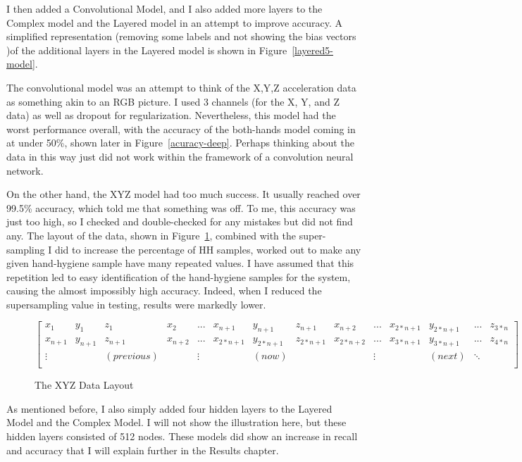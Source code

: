 \documentclass[]{report}
\begin{document}
I then added a Convolutional Model, and I also added more layers to the Complex model and the Layered model in an attempt to improve accuracy. A simplified representation (removing some labels and not showing the bias vectors )of the additional layers in the Layered model is shown in Figure~\ref{layered5-model}.

The convolutional model was an attempt to think of the X,Y,Z acceleration data as something akin to an RGB picture. I used 3 channels (for the X, Y, and Z data) as well as dropout for regularization. Nevertheless, this model had the worst performance overall, with the accuracy of the both-hands model coming in at under 50\%, shown later in Figure~\ref{acuracy-deep}. Perhaps thinking about the data in this way just did not work within the framework of a convolution neural network.

On the other hand, the XYZ model had too much success. It usually reached over 99.5\% accuracy, which told me that something was off. To me, this accuracy was just too high, so I checked and double-checked for any mistakes but did not find any. The layout of the data, shown in Figure~\ref{xyz-data}, combined with the super-sampling I did to increase the percentage of HH samples, worked out to make any given hand-hygiene sample have many repeated values. I have assumed that this repetition led to easy identification of the hand-hygiene samples for the system, causing the almost impossibly high accuracy. Indeed, when I reduced the supersampling value in testing, results were markedly lower.

\begin{figure}
	\centering
	$$
	\left[
	\begin{array}{cccccccccccccc}
	x_{1} & y_{1} & z_{1} & x_{2} & ... & x_{n+1} & y_{n+1} & z_{n+1} & x_{n+2} & ... & x_{2*n+1} & y_{2*n+1} & ... & z_{3*n} \\
	x_{n+1} & y_{n+1} & z_{n+1} & x_{n+2} & ... & x_{2*n+1} & y_{2*n+1} & z_{2*n+1} & x_{2*n+2} & ... & x_{3*n+1} & y_{3*n+1} & ... & z_{4*n} \\
	\vdots & & (previous) & & \vdots & & (now) & &  & \vdots & & (next) & \ddots\\
	\end{array}
	\right]
	$$
	\caption{The XYZ Data Layout}
	\label{xyz-data}
\end{figure}


As mentioned before, I also simply added four hidden layers to the Layered Model and the Complex Model. I will not show the illustration here, but these hidden layers consisted of 512 nodes. These models did show an increase in recall and accuracy that I will explain further in the Results chapter.
\end{document}
